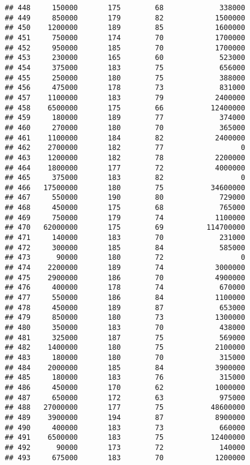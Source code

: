 \documentclass[
]{article}
\begin{document}
\begin{verbatim}
## 448     150000       175        68             338000
## 449     850000       179        82            1500000
## 450    1200000       189        85            1600000
## 451     750000       174        70            1700000
## 452     950000       185        70            1700000
## 453     230000       165        60             523000
## 454     375000       183        75             656000
## 455     250000       180        75             388000
## 456     475000       178        73             831000
## 457    1100000       183        79            2400000
## 458    6500000       175        66           12400000
## 459     180000       189        77             374000
## 460     270000       180        70             365000
## 461    1100000       184        82            2400000
## 462    2700000       182        77                  0
## 463    1200000       182        78            2200000
## 464    1800000       177        72            4000000
## 465     375000       183        82                  0
## 466   17500000       180        75           34600000
## 467     550000       190        80             729000
## 468     450000       175        68             765000
## 469     750000       179        74            1100000
## 470   62000000       175        69          114700000
## 471     140000       183        70             231000
## 472     300000       185        84             585000
## 473      90000       180        72                  0
## 474    2200000       189        74            3000000
## 475    2900000       186        70            4900000
## 476     400000       178        74             670000
## 477     550000       186        84            1100000
## 478     450000       189        87             653000
## 479     850000       180        73            1300000
## 480     350000       183        70             438000
## 481     325000       187        75             569000
## 482    1400000       180        75            2100000
## 483     180000       180        70             315000
## 484    2000000       185        84            3900000
## 485     180000       183        76             315000
## 486     450000       170        62            1000000
## 487     650000       172        63             975000
## 488   27000000       177        75           48600000
## 489    3900000       194        87            8900000
## 490     400000       183        73             660000
## 491    6500000       183        75           12400000
## 492      90000       173        72             140000
## 493     675000       183        70            1200000

\end{verbatim}
\end{document}
